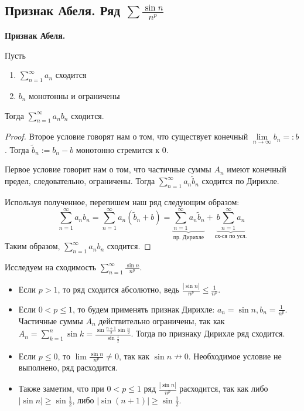 \subsection{Признак Абеля. Ряд $\sum \frac{\sin n}{n^p}$}
\textbf{Признак Абеля.} 

Пусть \begin{enumerate}
    \item $\sum\limits_{n=1}^\infty a_n$ сходится
    \item $b_n$ монотонны и ограничены
\end{enumerate}
Тогда $\sum\limits_{n=1}^\infty a_nb_n$ сходится.
\begin{proof}
    Второе условие говорят нам о том, что существует конечный $\lim\limits_{n \to \infty} b_n =: b$.
    Тогда $\widetilde{b}_n := b_n - b$ монотонно стремится к 0.

    \quad Первое условие говорит нам о том, что частичные суммы $A_n$ имеют конечный предел, следовательно, ограничены.
    Тогда $\sum\limits_{n=1}^\infty a_n\widetilde{b}_n$ сходится по Дирихле.

    \quad Используя полученное, перепишем наш ряд следующим образом: \[ \sum_{n=1}^\infty a_nb_n = \sum_{n=1}^\infty a_n(\widetilde{b}_n + b) = \underbrace{\sum_{n=1}^\infty a_n\widetilde{b}_n}_{\text{пр. Дирихле}} + \underbrace{b\sum_{n=1}^\infty a_n}_{\text{сх-ся по усл.}} \]
    \quad Таким образом, $\sum\limits_{n=1}^\infty a_nb_n$ сходится.
\end{proof}

\vspace{4mm}

\begin{example}
    Исследуем на сходимость $\sum\limits_{n=1}^\infty \frac{\sin n}{n^p}$.
    \begin{itemize}
        \item Если $p > 1$, то ряд сходится абсолютно, ведь $\frac{|\sin n|}{n^p} \leqslant \frac{1}{n^p}$.
        \item Если $0 < p \leqslant 1$, то будем применять признак Дирихле: $a_n = \sin n, b_n = \frac{1}{n^p}$. 
        Частичные суммы $A_n$ действительно ограничены, так как $A_n = \sum\limits_{k=1}^n \sin k = \frac{\sin \frac{n+1}{2}\sin \frac{n}{2}}{\sin \frac{1}{2}}$. Тогда по признаку Дирихле ряд сходится.
        \item Если $p \leqslant 0$, то $\lim \frac{\sin n}{n^p} \neq 0$, так как $\sin n \nrightarrow 0$. Необходимое условие не выполнено, ряд расходится.
        \item Также заметим, что при $0 < p \leqslant 1$ ряд $\frac{|\sin n|}{n^p}$ расходится, так как либо $|\sin n| \geqslant \sin \frac{1}{2}$, либо $|\sin (n+1)| \geqslant \sin \frac{1}{2}$.
    \end{itemize}
\end{example}
